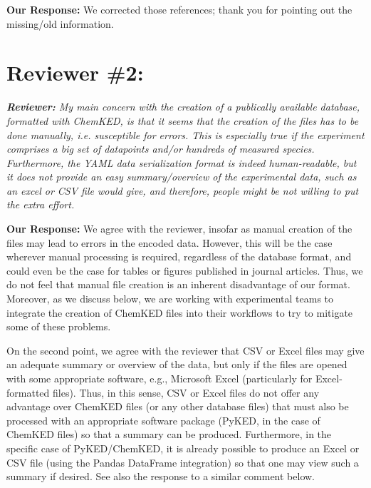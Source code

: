 \documentclass[a4paper,10pt]{elsarticle}
\newenvironment{reviewer}{\vspace{0.5\baselineskip}\begingroup\itshape\textbf{Reviewer:}}{\endgroup}
\newenvironment{response}{\textbf{Our Response:}}{\vspace{0.5\baselineskip}}
\begin{document}
\begin{response}
    We corrected those references; thank you for pointing out the missing\slash old information.
\end{response}

\section*{Reviewer \#2:}

\begin{reviewer}
    My main concern with the creation of a publically available database, formatted with ChemKED, is
    that it seems that the creation of the files has to be done manually, i.e. susceptible for
    errors. This is especially true if the experiment comprises a big set of datapoints and/or
    hundreds of measured species. Furthermore, the YAML data serialization format is indeed
    human-readable, but it does not provide an easy summary/overview of the experimental data, such
    as an excel or CSV file would give, and therefore, people might be not willing to put the extra
    effort.
\end{reviewer}

\begin{response}
    We agree with the reviewer, insofar as manual creation of the files may lead to errors in the
    encoded data. However, this will be the case wherever manual processing is required, regardless
    of the database format, and could even be the case for tables or figures published in journal
    articles. Thus, we do not feel that manual file creation is an inherent disadvantage of our
    format. Moreover, as we discuss below, we are working with experimental teams to integrate the
    creation of ChemKED files into their workflows to try to mitigate some of these problems.

    On the second point, we agree with the reviewer that CSV or Excel files may give an adequate
    summary or overview of the data, but only if the files are opened with some appropriate
    software, e.g., Microsoft Excel (particularly for Excel-formatted files). Thus, in this sense,
    CSV or Excel files do not offer any advantage over ChemKED files (or any other database files)
    that must also be processed with an appropriate software package (PyKED, in the case of ChemKED
    files) so that a summary can be produced. Furthermore, in the specific case of PyKED/ChemKED, it
    is already possible to produce an Excel or CSV file (using the Pandas DataFrame integration) so
    that one may view such a summary if desired. See also the response to a similar comment below.
\end{response}
\end{document}

